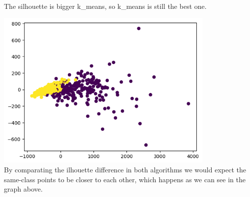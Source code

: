 \documentclass{article}
\begin{document}
The silhouette is bigger k\_means, so k\_means is still the best one.

\includegraphics[width=0.8\textwidth]{output3.png}\\[1ex]

By comparating the ilhouette difference in both algorithms we would expect the same-class points to be closer to each other, which happens as we can see in the graph above.
\end{document}
